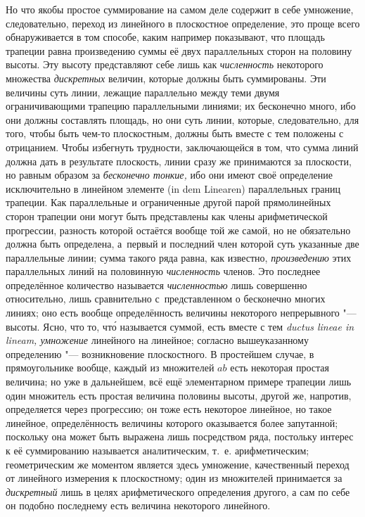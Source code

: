 Но что якобы простое суммирование на самом деле содержит в себе умножение,
следовательно, переход из линейного в плоскостное определение, это проще всего
обнаруживается в том способе, каким например показывают, что площадь трапеции
равна произведению суммы её двух параллельных сторон на половину высоты. Эту
высоту представляют себе лишь как {\em численность} некоторого множества
{\em дискретных} величин, которые должны быть суммированы. Эти величины суть
линии, лежащие параллельно между теми двумя ограничивающими трапецию
параллельными линиями; их бесконечно много, ибо они должны составлять площадь,
но они суть линии, которые, следовательно, для того, чтобы быть чем-то
плоскостным, должны быть вместе с тем положены с отрицанием. Чтобы избегнуть
трудности, заключающейся в том, что сумма линий должна дать в результате
плоскость, линии сразу же принимаются за плоскости, но равным образом за
{\em бесконечно тонкие,} ибо они имеют своё определение исключительно в
линейном элементе (in dem Li\-nea\-ren) параллельных границ трапеции. Как
параллельные и ограниченные другой парой прямолинейных сторон трапеции они
могут быть представлены как члены арифметической прогрессии, разность которой
остаётся вообще той же самой, но не обязательно должна быть определена,
а~первый и последний член которой суть указанные две параллельные линии; сумма
такого ряда равна, как известно, {\em произведению} этих параллельных линий на
половинную {\em численность} членов. Это последнее определённое количество
называется {\em численностью} лишь совершенно относительно, лишь сравнительно
с~представленном о бесконечно многих линиях; оно есть вообще определённость
величины некоторого {непрерывного} "--- высоты. Ясно, что то, чт\'{о} называется
суммой, есть вместе с тем {\em ductus lineae in lineam, умножение}
линейного на линейное; согласно вышеуказанному определению "--- возникновение
плоскостного. В простейшем случае, в прямоугольнике вообще, каждый из
множителей $ab$ есть некоторая простая величина; но уже в дальнейшем, всё ещё
элементарном примере трапеции лишь один множитель есть простая величина
половины высоты, другой же, напротив, определяется через прогрессию; он тоже
есть некоторое линейное, но такое линейное, определённость величины которого
оказывается более запутанной; поскольку она может быть выражена лишь
посредством ряда, постольку интерес к её суммированию называется аналитическим,
т.~е. арифметическим; геометрическим же моментом является здесь умножение,
качественный переход от линейного измерения к плоскостному; один из
множителей принимается за {\em дискретный} лишь в целях
арифметического определения другого, а сам по себе он
подобно последнему есть величина некоторого линейного.

